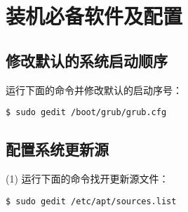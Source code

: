 \thispagestyle{empty}

\section{装机必备软件及配置}
\subsection{修改默认的系统启动顺序}
运行下面的命令并修改默认的启动序号：

\verb"$ sudo gedit /boot/grub/grub.cfg"

\subsection{配置系统更新源}
(1) 运行下面的命令找开更新源文件：

\verb"$ sudo gedit /etc/apt/sources.list"

